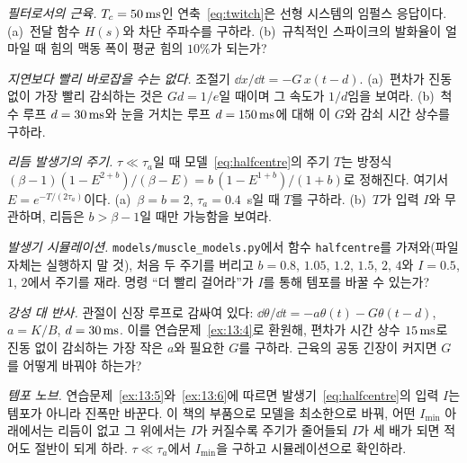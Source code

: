 \begin{exercise}[\lvlB]
\label{ex:13:3}
\emph{필터로서의 근육.} $T_c=50\,\text{ms}$인 연축~\eqref{eq:twitch}은 선형 시스템의 임펄스 응답이다. (a)~전달 함수 $H(s)$와 차단 주파수를 구하라. (b)~규칙적인 스파이크의 발화율이 얼마일 때 힘의 맥동 폭이 평균 힘의 $10\%$가 되는가?
\end{exercise}

\begin{exercise}[\lvlB]
\label{ex:13:4}
\emph{지연보다 빨리 바로잡을 수는 없다.} 조절기 $\dd x/\dd t=-G\,x(t-d)$. (a)~편차가 진동 없이 가장 빨리 감쇠하는 것은 $Gd=1/e$일 때이며 그 속도가 $1/d$임을 보여라. (b)~척수 루프 $d=30\,\text{ms}$와 눈을 거치는 루프 $d=150\,\text{ms}$에 대해 이 $G$와 감쇠 시간 상수를 구하라.
\end{exercise}

\begin{exercise}[\lvlB]
\label{ex:13:5}
\emph{리듬 발생기의 주기.} $\tau\ll\tau_a$일 때 모델~\eqref{eq:halfcentre}의 주기 $T$는 방정식 $(\beta-1)(1-E^{2+b})/(\beta-E)=b\,(1-E^{1+b})/(1+b)$로 정해진다. 여기서 $E=e^{-T/(2\tau_a)}$이다. (a)~$\beta=b=2$, $\tau_a=0.4$~s일 때 $T$를 구하라. (b)~$T$가 입력 $I$와 무관하며, 리듬은 $b>\beta-1$일 때만 가능함을 보여라.
\end{exercise}

\begin{exercise}[\lvlB]
\label{ex:13:6}
\emph{발생기 시뮬레이션.} \texttt{models/\allowbreak muscle\_models.py}에서 함수 \texttt{halfcentre}를 가져와(파일 자체는 실행하지 말 것), 처음 두 주기를 버리고 $b=0.8$, $1.05$, $1.2$, $1.5$, $2$, $4$와 $I=0.5$, $1$, $2$에서 주기를 재라. 명령 “더 빨리 걸어라”가 $I$를 통해 템포를 바꿀 수 있는가?
\end{exercise}

\begin{exercise}[\lvlB]
\label{ex:13:7}
\emph{강성 대 반사.} 관절이 신장 루프로 감싸여 있다: $\dd\theta/\dd t=-a\theta(t)-G\theta(t-d)$, $a=K/B$, $d=30\,\text{ms}$. 이를 연습문제~\ref{ex:13:4}로 환원해, 편차가 시간 상수 $15\,\text{ms}$로 진동 없이 감쇠하는 가장 작은 $a$와 필요한 $G$를 구하라. 근육의 공동 긴장이 커지면 $G$를 어떻게 바꿔야 하는가?
\end{exercise}

\begin{exercise}[\lvlC]
\label{ex:13:8}
\emph{템포 노브.} 연습문제~\ref{ex:13:5}와~\ref{ex:13:6}에 따르면 발생기~\eqref{eq:halfcentre}의 입력 $I$는 템포가 아니라 진폭만 바꾼다. 이 책의 부품으로 모델을 최소한으로 바꿔, 어떤 $I_{\min}$ 아래에서는 리듬이 없고 그 위에서는 $I$가 커질수록 주기가 줄어들되 $I$가 세 배가 되면 적어도 절반이 되게 하라. $\tau\ll\tau_a$에서 $I_{\min}$을 구하고 시뮬레이션으로 확인하라.
\end{exercise}
